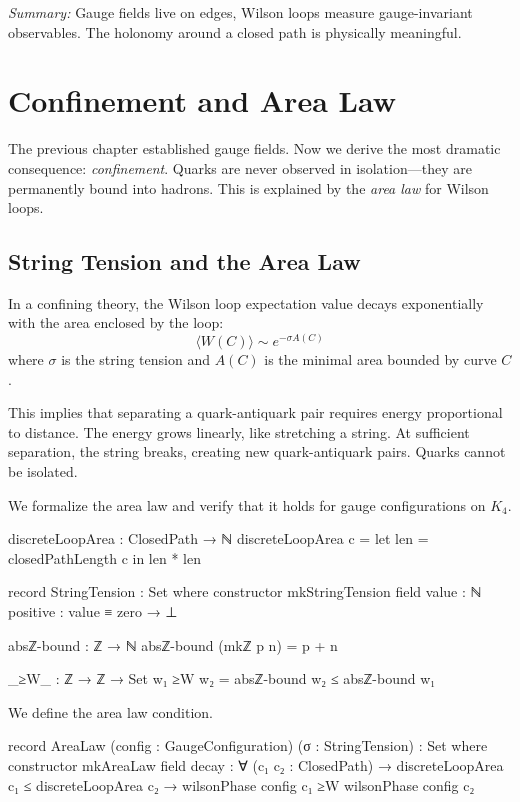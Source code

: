 \documentclass[11pt,a4paper]{book}
\begin{document}
\medskip
\noindent\textit{Summary:} Gauge fields live on edges, Wilson loops measure gauge-invariant 
observables. The holonomy around a closed path is physically meaningful.

\chapter{Confinement and Area Law}
\label{chap:confinement}

The previous chapter established gauge fields. Now we derive the most dramatic consequence: 
\emph{confinement}. Quarks are never observed in isolation—they are permanently bound into 
hadrons. This is explained by the \emph{area law} for Wilson loops.

\section{String Tension and the Area Law}

In a confining theory, the Wilson loop expectation value decays exponentially with the area enclosed by the loop:
\[
\langle W(C) \rangle \sim e^{-\sigma A(C)}
\]
where $\sigma$ is the string tension and $A(C)$ is the minimal area bounded by curve $C$.

This implies that separating a quark-antiquark pair requires energy proportional to distance. 
The energy grows linearly, like stretching a string. At sufficient separation, the string 
breaks, creating new quark-antiquark pairs. Quarks cannot be isolated.

We formalize the area law and verify that it holds for gauge configurations on $K_4$.

\begin{code}
discreteLoopArea : ClosedPath → ℕ
discreteLoopArea c = 
  let len = closedPathLength c
  in len * len

record StringTension : Set where
  constructor mkStringTension
  field
    value    : ℕ
    positive : value ≡ zero → ⊥

absℤ-bound : ℤ → ℕ
absℤ-bound (mkℤ p n) = p + n

_≥W_ : ℤ → ℤ → Set
w₁ ≥W w₂ = absℤ-bound w₂ ≤ absℤ-bound w₁
\end{code}

We define the area law condition.

\begin{code}
record AreaLaw (config : GaugeConfiguration) (σ : StringTension) : Set where
  constructor mkAreaLaw
  field
    decay : ∀ (c₁ c₂ : ClosedPath) →
            discreteLoopArea c₁ ≤ discreteLoopArea c₂ →
            wilsonPhase config c₁ ≥W wilsonPhase config c₂
\end{code}
\end{document}
